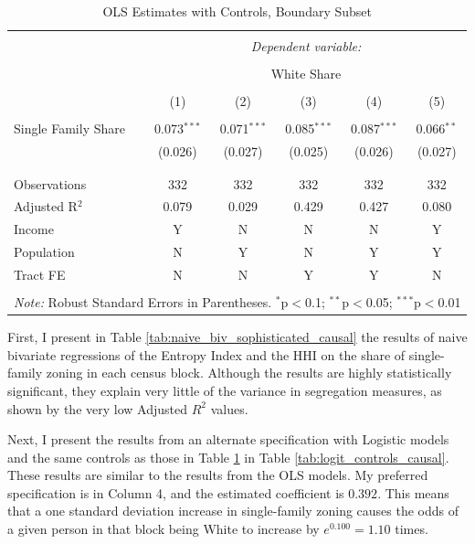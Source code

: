 \documentclass[11pt]{article}
\begin{document}
\begin{table}[!htbp] \centering 
  \caption{OLS Estimates with Controls, Boundary Subset}
  \label{tab:OLS_controls_causal} 
\begin{tabular}{@{\extracolsep{5pt}}lccccc} 
\\[-1.8ex]\hline 
\hline \\[-1.8ex] 
 & \multicolumn{5}{c}{\textit{Dependent variable:}} \\ 
\cline{2-6} 
\\[-1.8ex] & \multicolumn{5}{c}{White Share} \\ 
\\[-1.8ex] & (1) & (2) & (3) & (4) & (5)\\ 
\hline \\[-1.8ex] 
 Single Family Share & 0.073$^{***}$ & 0.071$^{***}$ & 0.085$^{***}$ & 0.087$^{***}$ & 0.066$^{**}$ \\ 
  & (0.026) & (0.027) & (0.025) & (0.026) & (0.027) \\ 
  & & & & & \\ 
\hline \\[-1.8ex] 
Observations & 332 & 332 & 332 & 332 & 332 \\ 
Adjusted R$^{2}$ & 0.079 & 0.029 & 0.429 & 0.427 & 0.080 \\ 
\hline
Income & Y & N & N & N & Y\\
Population & N & Y & N & Y & Y\\
Tract FE & N & N & Y & Y & N\\
\hline 
\hline \\[-1.8ex] 
\multicolumn{6}{l}{\textit{Note:} Robust Standard Errors in Parentheses. $^{*}$p$<$0.1; $^{**}$p$<$0.05; $^{***}$p$<$0.01} \\ 
\end{tabular} 
\end{table}

First, I present in Table \ref{tab:naive_biv_sophisticated_causal} the results of naive bivariate regressions of the Entropy Index and the HHI on the share of single-family zoning in each census block. Although the results are highly statistically significant, they explain very little of the variance in segregation measures, as shown by the very low Adjusted $R^2$ values.

Next, I present the results from an alternate specification with Logistic models and the same controls as those in Table \ref{tab:OLS_controls_causal} in Table \ref{tab:logit_controls_causal}. These results are similar to the results from the OLS models. My preferred specification is in Column 4, and the estimated coefficient is $0.392$. This means that a one standard deviation increase in single-family zoning causes the odds of a given person in that block being White to increase by $e^{0.100}=1.10$ times.
\end{document}
